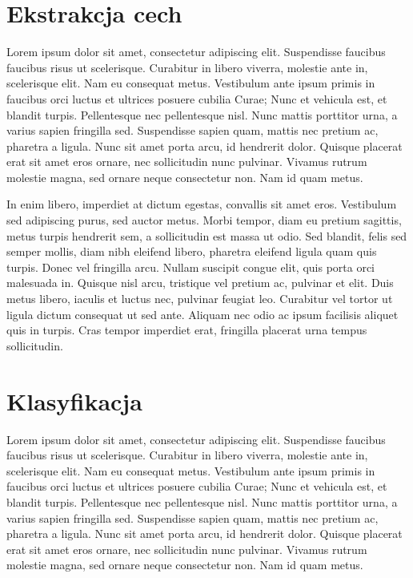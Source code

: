 \section{Ekstrakcja cech}

Lorem ipsum dolor sit amet, consectetur adipiscing elit. Suspendisse faucibus faucibus risus ut scelerisque. Curabitur in libero viverra, molestie ante in, scelerisque elit. Nam eu consequat metus. Vestibulum ante ipsum primis in faucibus orci luctus et ultrices posuere cubilia Curae; Nunc et vehicula est, et blandit turpis. Pellentesque nec pellentesque nisl. Nunc mattis porttitor urna, a varius sapien fringilla sed. Suspendisse sapien quam, mattis nec pretium ac, pharetra a ligula. Nunc sit amet porta arcu, id hendrerit dolor. Quisque placerat erat sit amet eros ornare, nec sollicitudin nunc pulvinar. Vivamus rutrum molestie magna, sed ornare neque consectetur non. Nam id quam metus.

In enim libero, imperdiet at dictum egestas, convallis sit amet eros. Vestibulum sed adipiscing purus, sed auctor metus. Morbi tempor, diam eu pretium sagittis, metus turpis hendrerit sem, a sollicitudin est massa ut odio. Sed blandit, felis sed semper mollis, diam nibh eleifend libero, pharetra eleifend ligula quam quis turpis. Donec vel fringilla arcu. Nullam suscipit congue elit, quis porta orci malesuada in. Quisque nisl arcu, tristique vel pretium ac, pulvinar et elit. Duis metus libero, iaculis et luctus nec, pulvinar feugiat leo. Curabitur vel tortor ut ligula dictum consequat ut sed ante. Aliquam nec odio ac ipsum facilisis aliquet quis in turpis. Cras tempor imperdiet erat, fringilla placerat urna tempus sollicitudin.

\section{Klasyfikacja}
Lorem ipsum dolor sit amet, consectetur adipiscing elit. Suspendisse faucibus faucibus risus ut scelerisque. Curabitur in libero viverra, molestie ante in, scelerisque elit. Nam eu consequat metus. Vestibulum ante ipsum primis in faucibus orci luctus et ultrices posuere cubilia Curae; Nunc et vehicula est, et blandit turpis. Pellentesque nec pellentesque nisl. Nunc mattis porttitor urna, a varius sapien fringilla sed. Suspendisse sapien quam, mattis nec pretium ac, pharetra a ligula. Nunc sit amet porta arcu, id hendrerit dolor. Quisque placerat erat sit amet eros ornare, nec sollicitudin nunc pulvinar. Vivamus rutrum molestie magna, sed ornare neque consectetur non. Nam id quam metus.

